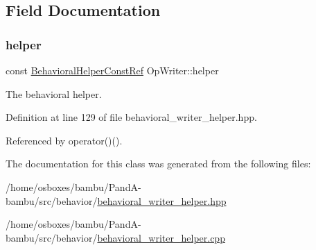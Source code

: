 \subsection{Field Documentation}
\mbox{\label{classOpWriter_ae479e91af7726e304f6bcc1208f45e75}} 
\subsubsection{\texorpdfstring{helper}{helper}}
{\footnotesize\ttfamily const \hyperlink{behavioral__helper_8hpp_aae973b54cac87eef3b27442aa3e1e425}{Behavioral\+Helper\+Const\+Ref} Op\+Writer\+::helper\hspace{0.3cm}{\ttfamily [protected]}}



The behavioral helper. 



Definition at line 129 of file behavioral\+\_\+writer\+\_\+helper.\+hpp.



Referenced by operator()().



The documentation for this class was generated from the following files\+:\begin{DoxyCompactItemize}
\item 
/home/osboxes/bambu/\+Pand\+A-\/bambu/src/behavior/\hyperlink{behavioral__writer__helper_8hpp}{behavioral\+\_\+writer\+\_\+helper.\+hpp}\item 
/home/osboxes/bambu/\+Pand\+A-\/bambu/src/behavior/\hyperlink{behavioral__writer__helper_8cpp}{behavioral\+\_\+writer\+\_\+helper.\+cpp}\end{DoxyCompactItemize}
